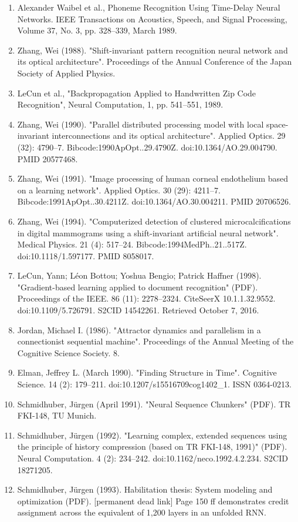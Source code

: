 \begin{enumerate}
\item Alexander Waibel et al., Phoneme Recognition Using Time-Delay Neural Networks. IEEE Transactions on Acoustics, Speech, and Signal Processing, Volume 37, No. 3, pp. 328–339, March 1989.
\item Zhang, Wei (1988). "Shift-invariant pattern recognition neural network and its optical architecture". Proceedings of the Annual Conference of the Japan Society of Applied Physics.
\item LeCun et al., "Backpropagation Applied to Handwritten Zip Code Recognition", Neural Computation, 1, pp. 541–551, 1989.
\item Zhang, Wei (1990). "Parallel distributed processing model with local space-invariant interconnections and its optical architecture". Applied Optics. 29 (32): 4790–7. Bibcode:1990ApOpt..29.4790Z. doi:10.1364/AO.29.004790. PMID 20577468.
\item Zhang, Wei (1991). "Image processing of human corneal endothelium based on a learning network". Applied Optics. 30 (29): 4211–7. Bibcode:1991ApOpt..30.4211Z. doi:10.1364/AO.30.004211. PMID 20706526.
\item Zhang, Wei (1994). "Computerized detection of clustered microcalcifications in digital mammograms using a shift-invariant artificial neural network". Medical Physics. 21 (4): 517–24. Bibcode:1994MedPh..21..517Z. doi:10.1118/1.597177. PMID 8058017.
\item LeCun, Yann; Léon Bottou; Yoshua Bengio; Patrick Haffner (1998). "Gradient-based learning applied to document recognition" (PDF). Proceedings of the IEEE. 86 (11): 2278–2324. CiteSeerX 10.1.1.32.9552. doi:10.1109/5.726791. S2CID 14542261. Retrieved October 7, 2016.
\item Jordan, Michael I. (1986). "Attractor dynamics and parallelism in a connectionist sequential machine". Proceedings of the Annual Meeting of the Cognitive Science Society. 8.
\item Elman, Jeffrey L. (March 1990). "Finding Structure in Time". Cognitive Science. 14 (2): 179–211. doi:10.1207/s15516709cog1402_1. ISSN 0364-0213.
\item Schmidhuber, Jürgen (April 1991). "Neural Sequence Chunkers" (PDF). TR FKI-148, TU Munich.
\item Schmidhuber, Jürgen (1992). "Learning complex, extended sequences using the principle of history compression (based on TR FKI-148, 1991)" (PDF). Neural Computation. 4 (2): 234–242. doi:10.1162/neco.1992.4.2.234. S2CID 18271205.
\item Schmidhuber, Jürgen (1993). Habilitation thesis: System modeling and optimization (PDF). [permanent dead link] Page 150 ff demonstrates credit assignment across the equivalent of 1,200 layers in an unfolded RNN.

\end{enumerate}
